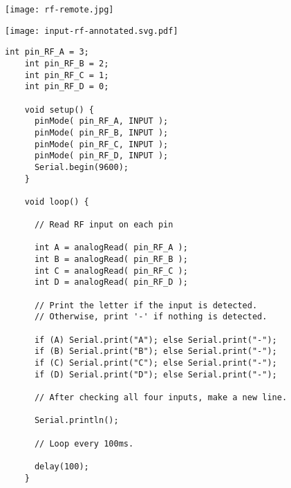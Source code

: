 \vspace{0.1in}
\begin{minipage}[t]{0.49\tw}

  \vspace{0.1in}
  \texttt{[image: rf-remote.jpg]}

  \vspace{0.1in}
  \texttt{[image: input-rf-annotated.svg.pdf]}

\end{minipage}
\hfill
\begin{minipage}[t]{0.49\tw}
  \vspace{0.1in}
  \begin{Verbatim}[gobble=3,fontsize=\small]
    int pin_RF_A = 3;
    int pin_RF_B = 2;
    int pin_RF_C = 1;
    int pin_RF_D = 0;

    void setup() {
      pinMode( pin_RF_A, INPUT );
      pinMode( pin_RF_B, INPUT );
      pinMode( pin_RF_C, INPUT );
      pinMode( pin_RF_D, INPUT );
      Serial.begin(9600);
    }

    void loop() {

      // Read RF input on each pin

      int A = analogRead( pin_RF_A );
      int B = analogRead( pin_RF_B );
      int C = analogRead( pin_RF_C );
      int D = analogRead( pin_RF_D );

      // Print the letter if the input is detected.
      // Otherwise, print '-' if nothing is detected.

      if (A) Serial.print("A"); else Serial.print("-");
      if (B) Serial.print("B"); else Serial.print("-");
      if (C) Serial.print("C"); else Serial.print("-");
      if (D) Serial.print("D"); else Serial.print("-");

      // After checking all four inputs, make a new line.

      Serial.println();

      // Loop every 100ms.

      delay(100);
    }
  \end{Verbatim}
\end{minipage}
\vspace{0.1in}

